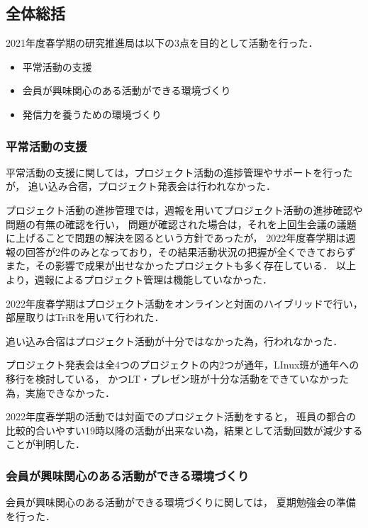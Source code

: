 \subsection*{全体総括}


2021年度春学期の研究推進局は以下の3点を目的として活動を行った．

\begin{itemize}
    \item 平常活動の支援
    \item 会員が興味関心のある活動ができる環境づくり
    \item 発信力を養うための環境づくり
\end{itemize}

\subsubsection*{平常活動の支援}
平常活動の支援に関しては，プロジェクト活動の進捗管理やサポートを行ったが，
追い込み合宿，プロジェクト発表会は行われなかった．

プロジェクト活動の進捗管理では，週報を用いてプロジェクト活動の進捗確認や問題の有無の確認を行い，
問題が確認された場合は，それを上回生会議の議題に上げることで問題の解決を図るという方針であったが，
2022年度春学期は週報の回答が2件のみとなっており，その結果活動状況の把握が全くできておらず
また，その影響で成果が出せなかったプロジェクトも多く存在している．
以上より，週報によるプロジェクト管理は機能していなかった．

2022年度春学期はプロジェクト活動をオンラインと対面のハイブリッドで行い，
部屋取りはTriRを用いて行われた．

追い込み合宿はプロジェクト活動が十分ではなかった為，行われなかった．

プロジェクト発表会は全4つのプロジェクトの内2つが通年，LInux班が通年への移行を検討している，
かつLT・プレゼン班が十分な活動をできていなかった為，実施できなかった．

2022年度春学期の活動では対面でのプロジェクト活動をすると，
班員の都合の比較的合いやすい19時以降の活動が出来ない為，結果として活動回数が減少することが判明した．

\subsubsection*{会員が興味関心のある活動ができる環境づくり}
会員が興味関心のある活動ができる環境づくりに関しては，
夏期勉強会の準備を行った．

